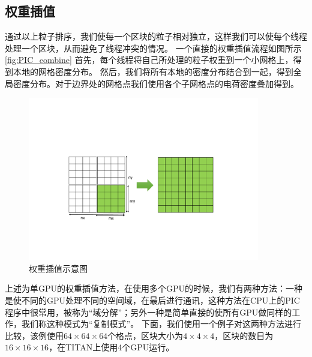 \subsection{权重插值}
\label{section:PIC_GPU_depositor}
通过以上粒子排序，我们使每一个区块的粒子相对独立，这样我们可以使每个线程处理一个区块，从而避免了线程冲突的情况。
一个直接的权重插值流程如图所示\eqref{fig:PIC_combine}
首先，每个线程将自己所处理的粒子权重到一个小网格上，得到本地的网格密度分布。
然后，我们将所有本地的密度分布结合到一起，得到全局密度分布。对于边界处的网格点我们使用各个子网格点的电荷密度叠加得到。

\begin{figure}[!htb]
    \centering
    \includegraphics[width=0.9\textwidth]{Img/3PIC_combine.pdf}
    \caption{权重插值示意图}
    \label{fig:PIC_combine}
\end{figure}

上述为单GPU的权重插值方法，在使用多个GPU的时候，我们有两种方法：一种是使不同的GPU处理不同的空间域，在最后进行通讯，这种方法在CPU上的PIC程序中很常用，被称为“域分解”；另外一种是简单直接的使所有GPU做同样的工作，我们称这种模式为“复制模式”。
下面，我们使用一个例子对这两种方法进行比较，该例使用$64 \times 64 \times 64$个格点，区块大小为$4 \times 4 \times 4$，区块的数目为$16 \times 16 \times 16$，在TITAN上使用4个GPU运行。

